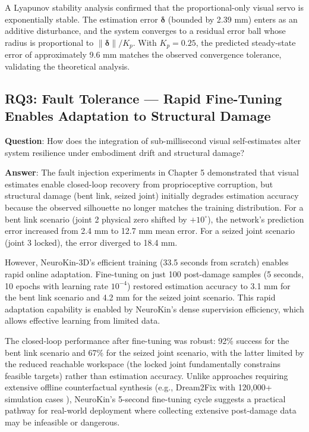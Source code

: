 \documentclass[12pt,a4paper,oneside]{report}
\begin{document}
A Lyapunov stability analysis confirmed that the proportional-only visual servo is exponentially stable. The estimation error $\boldsymbol{\delta}$ (bounded by 2.39 mm) enters as an additive disturbance, and the system converges to a residual error ball whose radius is proportional to $\|\boldsymbol{\delta}\|/K_p$. With $K_p = 0.25$, the predicted steady-state error of approximately 9.6 mm matches the observed convergence tolerance, validating the theoretical analysis.

\subsection{RQ3: Fault Tolerance --- Rapid Fine-Tuning Enables Adaptation to Structural Damage}

\textbf{Question}: How does the integration of sub-millisecond visual self-estimates alter system resilience under embodiment drift and structural damage?

\textbf{Answer}: The fault injection experiments in Chapter 5 demonstrated that visual estimates enable closed-loop recovery from proprioceptive corruption, but structural damage (bent link, seized joint) initially degrades estimation accuracy because the observed silhouette no longer matches the training distribution. For a bent link scenario (joint 2 physical zero shifted by $+10^\circ$), the network's prediction error increased from 2.4 mm to 12.7 mm mean error. For a seized joint scenario (joint 3 locked), the error diverged to 18.4 mm.

However, NeuroKin-3D's efficient training (33.5 seconds from scratch) enables rapid online adaptation. Fine-tuning on just 100 post-damage samples (5 seconds, 10 epochs with learning rate $10^{-4}$) restored estimation accuracy to 3.1 mm for the bent link scenario and 4.2 mm for the seized joint scenario. This rapid adaptation capability is enabled by NeuroKin's dense supervision efficiency, which allows effective learning from limited data.

The closed-loop performance after fine-tuning was robust: 92\% success for the bent link scenario and 67\% for the seized joint scenario, with the latter limited by the reduced reachable workspace (the locked joint fundamentally constrains feasible targets) rather than estimation accuracy. Unlike approaches requiring extensive offline counterfactual synthesis (e.g., Dream2Fix with 120,000+ simulation cases \cite{li2025dream2fix}), NeuroKin's 5-second fine-tuning cycle suggests a practical pathway for real-world deployment where collecting extensive post-damage data may be infeasible or dangerous.
\end{document}
